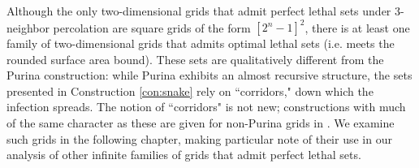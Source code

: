 Although the only two-dimensional grids that admit perfect lethal sets under 3-neighbor percolation are square grids of the form $[2^n-1]^2$, there is at least one family of two-dimensional grids that admits optimal lethal sets (i.e. meets the rounded surface area bound). These sets are qualitatively different from the Purina construction: while Purina exhibits an almost recursive structure, the sets presented in Construction \ref{con:snake} rely on ``corridors," down which the infection spreads. The notion of ``corridors" is not new; constructions with much of the same character as these are given for non-Purina grids in \cite{benevides:2021}. We examine such grids in the following chapter, making particular note of their use in our analysis of other infinite families of grids that admit perfect lethal sets. 

